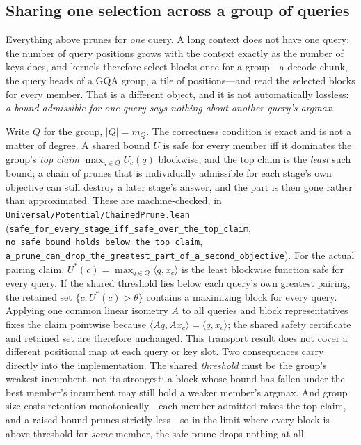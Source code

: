 \documentclass[11pt]{article}
\numberwithin{equation}{section}
\newcommand{\inner}[2]{\langle #1, #2\rangle}
\begin{document}
\subsection{Sharing one selection across a group of queries}\label{sec:group}

Everything above prunes for \emph{one} query. A long context does not have one query: the number of query
positions grows with the context exactly as the number of keys does, and kernels therefore select blocks once
for a group---a decode chunk, the query heads of a GQA group, a tile of positions---and read the selected
blocks for every member. That is a different object, and it is not automatically lossless:
\emph{a bound admissible for one query says nothing about another query's argmax.}

Write $Q$ for the group, $\lvert Q\rvert=m_Q$. The correctness condition is exact and is not a matter of
degree. A shared bound $U$ is safe for every member iff it dominates the group's \emph{top claim}
$\max_{q\in Q}U_c(q)$ blockwise, and the top claim is the \emph{least} such bound; a chain of prunes that is
individually admissible for each stage's own objective can still destroy a later stage's answer, and the part
is then gone rather than approximated. These are machine-checked, in
\texttt{Universal/Potential/ChainedPrune.lean}
(\texttt{safe\_for\_every\_stage\_iff\_safe\_over\_the\_top\_claim},
\texttt{no\_safe\_bound\_holds\_below\_the\_top\_claim},
\texttt{a\_prune\_can\_drop\_the\_greatest\_part\_of\_a\_second\_objective}). For the actual pairing claim,
$U^*(c)=\max_{q\in Q}\inner{q}{x_c}$ is the least blockwise function safe for every query. If the shared
threshold lies below each query's own greatest pairing, the retained set
$\{c:U^*(c)>\theta\}$ contains a maximizing block for every query. Applying one common linear isometry $A$
to all queries and block representatives fixes the claim pointwise because
$\inner{Aq}{Ax_c}=\inner{q}{x_c}$; the shared safety certificate and retained set are therefore unchanged.
This transport result does not cover a different positional map at each query or key slot. Two consequences
carry directly into the implementation. The shared \emph{threshold} must be the group's weakest incumbent, not its
strongest: a block whose bound has fallen under the best member's incumbent may still hold a weaker member's
argmax. And group size costs retention monotonically---each member admitted raises the top claim, and a
raised bound prunes strictly less---so in the limit where every block is above threshold for \emph{some}
member, the safe prune drops nothing at all.
\end{document}
